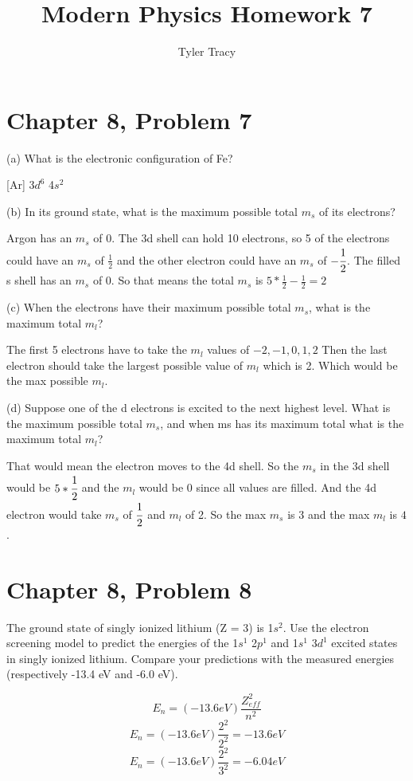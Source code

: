 \documentclass[12pt]{article}
\title{Modern Physics Homework 7}
\author{Tyler Tracy}
\begin{document}
\maketitle

\section*{Chapter 8, Problem 7}


(a) What is the electronic configuration of Fe?

[Ar] 3$d^6$ 4$s^2$


(b) In its ground state, what is the maximum possible total $m_s$ of its electrons?

Argon has an $m_s$ of 0. The 3d shell can hold 10 electrons, so 5 of the electrons could have an $m_s$ of $\frac{1}{2}$ and the other electron could have an $m_s$ of $-\cfrac{1}{2}$. The filled s shell has an $m_s$ of 0. So that means the total $m_s$ is $ 5 * \frac{1}{2} - \frac{1}{2} = 2$


(c) When the electrons have their maximum possible total $m_s$, what is the maximum total $m_l$?

The first 5 electrons have to take the $m_l$ values of $-2, -1, 0, 1, 2$ Then the last electron should take the largest possible value of $m_l$ which is 2. Which would be the max possible $m_l$.

(d) Suppose one of the d electrons is excited to the next highest level. What is the maximum possible total $m_s$, and when ms has its maximum total what is the maximum total $m_l$?

That would mean the electron moves to the 4d shell. So the $m_s$ in the 3d shell would be $5 * \cfrac{1}{2}$ and the $m_l$ would be 0 since all values are filled. And the 4d electron would take $m_s$ of $\cfrac{1}{2}$ and $m_l$ of 2.
So the max $m_s$ is $3$ and the max $m_l$ is $4$.


\section*{Chapter 8, Problem 8}


The ground state of singly ionized lithium (Z = 3) is 1$s^2$. Use the electron screening model to predict the energies of the 1$s^1$ 2$p^1$ and 1$s^1$ 3$d^1$ excited states in singly ionized lithium. Compare your predictions with the measured energies (respectively -13.4 eV and -6.0 eV).

$$ E_n = (-13.6 eV) \frac{Z^2_{eff}}{n^2} $$
$$ E_n = (-13.6 eV) \frac{2^2}{2^2} = - 13.6 eV$$
$$ E_n = (-13.6 eV) \frac{2^2}{3^2} = - 6.04 eV$$
\end{document}
